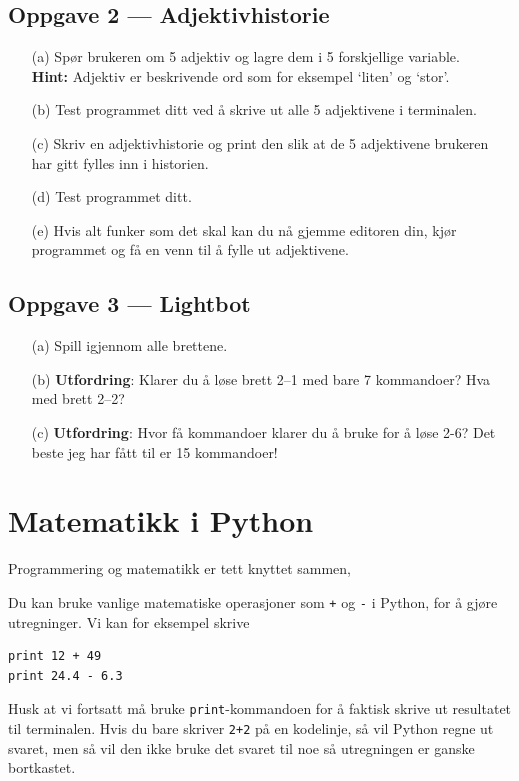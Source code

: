 \documentclass[a4paper, 11pt, notitlepage]{article}
\begin{document}
\subsection*{Oppgave 2 --- Adjektivhistorie}
\begin{itemize}
\item[(a)] Spør brukeren om 5 adjektiv og lagre dem i 5 forskjellige variable. \\
	\textbf{Hint:} Adjektiv er beskrivende ord som for eksempel `liten' og `stor'.
\item[(b)] Test programmet ditt ved å skrive ut alle 5 adjektivene i terminalen.
\item[(c)] Skriv en adjektivhistorie og print den slik at de 5 adjektivene brukeren har gitt fylles inn i historien.
\item[(d)] Test programmet ditt.
\item[(e)] Hvis alt funker som det skal kan du nå gjemme editoren din, kjør programmet og få en venn til å fylle ut adjektivene.
\end{itemize}

\subsection*{Oppgave 3 --- Lightbot}
\begin{itemize}
\item[(a)] Spill igjennom alle brettene.
\item[(b)] \textbf{Utfordring}: Klarer du å løse brett 2--1 med bare 7 kommandoer? Hva med brett 2--2?
\item[(c)] \textbf{Utfordring}: Hvor få kommandoer klarer du å bruke for å løse 2-6? Det beste jeg har fått til er 15 kommandoer!
\end{itemize}

\clearpage

\section*{Matematikk i Python}

Programmering og matematikk er tett knyttet sammen, 


Du kan bruke vanlige matematiske operasjoner som \verb!+! og \verb!-! i Python, for å gjøre utregninger. Vi kan for eksempel skrive
\begin{lstlisting}
print 12 + 49
print 24.4 - 6.3
\end{lstlisting}
Husk at vi fortsatt må bruke \verb+print+-kommandoen for å faktisk skrive ut resultatet til terminalen. Hvis du bare skriver \verb!2+2! på en kodelinje, så vil Python regne ut svaret, men så vil den ikke bruke det svaret til noe så utregningen er ganske bortkastet.
\end{document}

